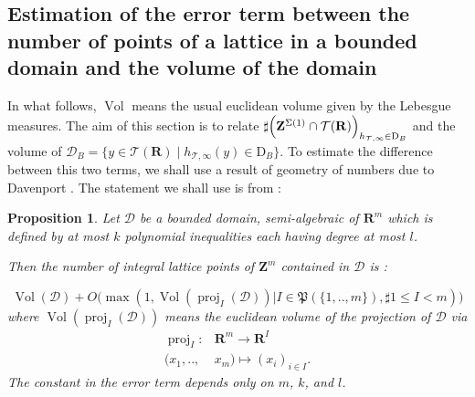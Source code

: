 \documentclass{proc-l}
\newcommand{\R}{\mathbf{R}}
\newcommand{\Z}{\mathbf{Z}}
\DeclareMathOperator{\proj}{proj}
\DeclareMathOperator{\Vol}{Vol}
\newcommand{\stackT}{\mathcal{T}}
\newtheorem{prop}[theorem]{Proposition}
\theoremstyle{definition}
\theoremstyle{remark}
\numberwithin{equation}{section}
\begin{document}
\subsection{Estimation of the error term between the number of points of a lattice in a bounded domain and the volume of the domain}

In what follows, $\Vol$ means the usual euclidean volume given by the Lebesgue measures. The aim of this section is to relate $\sharp \Bigl( \Z^{\Sigma(1)} \cap \stackT(\R) \Bigr)_{h_{\stackT,\infty} \in \mathrm{D}_{B}}$ and the volume of $\mathcal{D}_B = \{ y \in \stackT(\R) \mid h_{\stackT,\infty}(y) \in \mathrm{D}_{B}\}$. To estimate the difference between this two terms, we shall use a result of geometry of numbers due to Davenport \cite{davenport_geometry_numbers}. The statement we shall use is from \cite[proposition 24]{bhargava_counting_cubic_field}:



\begin{prop}\label{bhargava_geometrie_nombre}
Let $\mathcal{D}$ be a bounded domain,  semi-algebraic of $\R^m$ which is defined by at most $k$ polynomial inequalities each having degree at most $l$.


Then the number of integral lattice points of $\Z^m$ contained in $\mathcal{D}$ is :

$$\Vol(\mathcal{D}) + O\bigl( \max(1,\Vol(\proj_I(\mathcal{D})) | I \in \mathfrak{P}(\{1,..,m\}),  \sharp 1 \leqslant I < m) \bigr)$$where $\Vol(\proj_I(\mathcal{D}))$ means the euclidean volume of the projection of $\mathcal{D}$ via 
\begin{align*}
    \proj_I : &\R^m \rightarrow \R^{ I} \\
    (x_1,..,&x_m) \longmapsto (x_i)_{i \in I} .
\end{align*}
The constant in the error term depends only on $m$, $k$, and $l$.

\end{prop}
\end{document}
